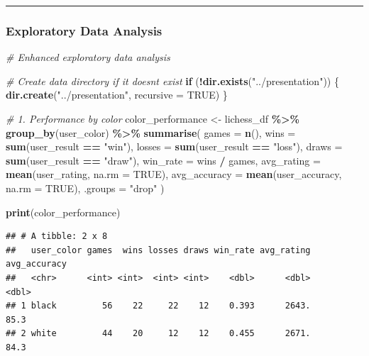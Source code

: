 \documentclass[
]{article}
\newenvironment{Shaded}{\begin{snugshade}}{\end{snugshade}}
\newcommand{\AttributeTok}[1]{\textcolor[rgb]{0.13,0.29,0.53}{#1}}
\newcommand{\CommentTok}[1]{\textcolor[rgb]{0.56,0.35,0.01}{\textit{#1}}}
\newcommand{\ConstantTok}[1]{\textcolor[rgb]{0.56,0.35,0.01}{#1}}
\newcommand{\ControlFlowTok}[1]{\textcolor[rgb]{0.13,0.29,0.53}{\textbf{#1}}}
\newcommand{\FunctionTok}[1]{\textcolor[rgb]{0.13,0.29,0.53}{\textbf{#1}}}
\newcommand{\NormalTok}[1]{#1}
\newcommand{\OtherTok}[1]{\textcolor[rgb]{0.56,0.35,0.01}{#1}}
\newcommand{\SpecialCharTok}[1]{\textcolor[rgb]{0.81,0.36,0.00}{\textbf{#1}}}
\newcommand{\StringTok}[1]{\textcolor[rgb]{0.31,0.60,0.02}{#1}}
\begin{document}
\begin{center}\rule{0.5\linewidth}{0.5pt}\end{center}

\subsubsection{Exploratory Data
Analysis}\label{exploratory-data-analysis}

\begin{Shaded}
\begin{Highlighting}[]
\CommentTok{\# Enhanced exploratory data analysis}

\CommentTok{\# Create data directory if it doesn\textquotesingle{}t exist}
\ControlFlowTok{if}\NormalTok{ (}\SpecialCharTok{!}\FunctionTok{dir.exists}\NormalTok{(}\StringTok{"../presentation"}\NormalTok{)) \{}
  \FunctionTok{dir.create}\NormalTok{(}\StringTok{"../presentation"}\NormalTok{, }\AttributeTok{recursive =} \ConstantTok{TRUE}\NormalTok{)}
\NormalTok{\}}

\CommentTok{\# 1. Performance by color}
\NormalTok{color\_performance }\OtherTok{\textless{}{-}}\NormalTok{ lichess\_df }\SpecialCharTok{\%\textgreater{}\%}
  \FunctionTok{group\_by}\NormalTok{(user\_color) }\SpecialCharTok{\%\textgreater{}\%}
  \FunctionTok{summarise}\NormalTok{(}
    \AttributeTok{games =} \FunctionTok{n}\NormalTok{(),}
    \AttributeTok{wins =} \FunctionTok{sum}\NormalTok{(user\_result }\SpecialCharTok{==} \StringTok{"win"}\NormalTok{),}
    \AttributeTok{losses =} \FunctionTok{sum}\NormalTok{(user\_result }\SpecialCharTok{==} \StringTok{"loss"}\NormalTok{),}
    \AttributeTok{draws =} \FunctionTok{sum}\NormalTok{(user\_result }\SpecialCharTok{==} \StringTok{"draw"}\NormalTok{),}
    \AttributeTok{win\_rate =}\NormalTok{ wins }\SpecialCharTok{/}\NormalTok{ games,}
    \AttributeTok{avg\_rating =} \FunctionTok{mean}\NormalTok{(user\_rating, }\AttributeTok{na.rm =} \ConstantTok{TRUE}\NormalTok{),}
    \AttributeTok{avg\_accuracy =} \FunctionTok{mean}\NormalTok{(user\_accuracy, }\AttributeTok{na.rm =} \ConstantTok{TRUE}\NormalTok{),}
    \AttributeTok{.groups =} \StringTok{"drop"}
\NormalTok{  )}

\FunctionTok{print}\NormalTok{(color\_performance)}
\end{Highlighting}
\end{Shaded}

\begin{verbatim}
## # A tibble: 2 x 8
##   user_color games  wins losses draws win_rate avg_rating avg_accuracy
##   <chr>      <int> <int>  <int> <int>    <dbl>      <dbl>        <dbl>
## 1 black         56    22     22    12    0.393      2643.         85.3
## 2 white         44    20     12    12    0.455      2671.         84.3
\end{verbatim}
\end{document}
